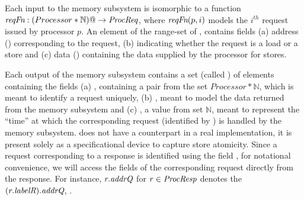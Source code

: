 Each input to the memory subsystem is isomorphic to a function
$\textit{reqFn}:(Processor*\mathbb{N}) @-> \textit{ProcReq}$, where $\textit{reqFn}(p, i)$ models the
$i^{th}$ request issued by processor $p$. An element of the range-set of
\reqFn{}, \viz \Request{} contains fields (a) address (\addrQ) corresponding to
the request, (b) \desc{} indicating whether the request is a load or a store
and (c) data (\dataQ) containing the data supplied by the processor for stores.

Each output of the memory subsystem contains a set (called \Response) of
elements containing the fields (a) , containing a pair from the set
$Processor*\mathbb{N}$, which is meant to identify a request uniquely, (b)
\dataR, meant to model the data returned from the memory subsystem and (c)
\timeR, a value from set $\mathbb{N}$, meant to represent the ``time'' at which
the corresponding request (identified by ) is handled by the memory
subsystem. \timeR{} does not have a counterpart in a real implementation, it is
present solely as a specificational device to capture store atomicity. Since a
request corresponding to a response is identified using the field , for
notational convenience, we will access the fields of the corresponding request
directly from the response. For instance, $r.\textit{addrQ}$ for $r \in \textit{ProcResp}$
denotes the $(r.\textit{labelR}).\textit{addrQ}$, \etc.

